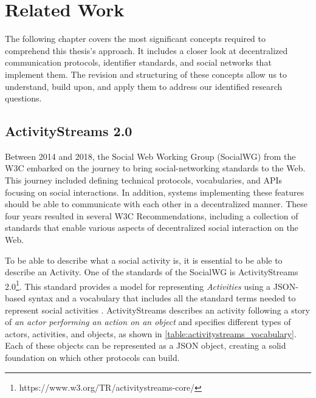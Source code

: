 \chapter{Related Work}
\label{cha:relatedwork}

The following chapter covers the most significant concepts required to comprehend this thesis's approach. It includes a closer look at decentralized communication protocols, identifier standards, and social networks that implement them. The revision and structuring of these concepts allow us to understand, build upon, and apply them to address our identified research questions. 

\section{ActivityStreams 2.0}\label{section:activity_streams}
Between 2014 and 2018, the Social Web Working Group (SocialWG) from the W3C embarked on the journey to bring social-networking standards to the Web. This journey included defining technical protocols, vocabularies, and APIs focusing on social interactions. In addition, systems implementing these features should be able to communicate with each other in a decentralized manner. These four years resulted in several W3C Recommendations, including a collection of standards that enable various aspects of decentralized social interaction on the Web\cite{celik_prodromou_le_hors_2014}. 

To be able to describe what a social activity is, it is essential to be able to describe an Activity. One of the standards of the SocialWG is ActivityStreams 2.0\footnote{https://www.w3.org/TR/activitystreams-core/}. This standard provides a model for representing \emph{Activities} using a JSON-based syntax and a vocabulary that includes all the standard terms needed to represent social activities \cite{snell_prodromou_2017}. ActivityStreams describes an activity following a story of \emph{an actor performing an action on an object} and specifies different types of actors, activities, and objects, as shown in \autoref{table:activitystreams_vocabulary}. Each of these objects can be represented as a JSON object, creating a solid foundation on which other protocols can build. 

